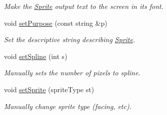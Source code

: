\begin{DoxyCompactItemize}
\begin{DoxyCompactList}\small\item\em Make the \hyperlink{class_sprite}{Sprite} output text to the screen in its font. \end{DoxyCompactList}\item 
void \hyperlink{class_sprite_ac5cdeb3206d89719fc10af1146ebbaf6}{set\+Purpose} (const string \&p)\hypertarget{class_sprite_ac5cdeb3206d89719fc10af1146ebbaf6}{}\label{class_sprite_ac5cdeb3206d89719fc10af1146ebbaf6}

\begin{DoxyCompactList}\small\item\em Set the descriptive string describing \hyperlink{class_sprite}{Sprite}. \end{DoxyCompactList}\item 
void \hyperlink{class_sprite_a1ce4def2f83442fd086e38568f93c6cd}{set\+Spline} (int s)\hypertarget{class_sprite_a1ce4def2f83442fd086e38568f93c6cd}{}\label{class_sprite_a1ce4def2f83442fd086e38568f93c6cd}

\begin{DoxyCompactList}\small\item\em Manually sets the number of pixels to spline. \end{DoxyCompactList}\item 
void \hyperlink{class_sprite_aa9d0dd6123988d79c94a18f3e404d8d7}{set\+Sprite} (sprite\+Type st)\hypertarget{class_sprite_aa9d0dd6123988d79c94a18f3e404d8d7}{}\label{class_sprite_aa9d0dd6123988d79c94a18f3e404d8d7}

\begin{DoxyCompactList}\small\item\em Manually change sprite type (facing, etc). \end{DoxyCompactList}\end{DoxyCompactItemize}
